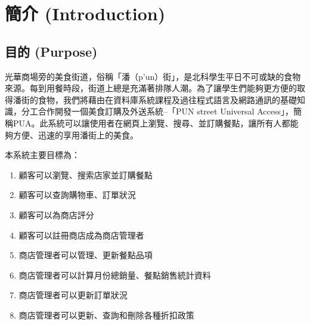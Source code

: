 \documentclass[a4paper, 12pt]{article}
\begin{document}





\section{簡介 (Introduction)}

\subsection{目的 (Purpose)}

光華商場旁的美食街道，俗稱「潘（p'un）街」，是北科學生平日不可或缺的食物來源。每到用餐時段，街道上總是充滿著排隊人潮。為了讓學生們能夠更方便的取得潘街的食物，我們將藉由在資料庫系統課程及過往程式語言及網路通訊的基礎知識，分工合作開發一個美食訂購及外送系統--「PUN street Universal Access」，簡稱PUA。此系統可以讓使用者在網頁上瀏覽、搜尋、並訂購餐點，讓所有人都能夠方便、迅速的享用潘街上的美食。

\noindent 本系統主要目標為：
\begin{enumerate}
  \item 顧客可以瀏覽、搜索店家並訂購餐點
  \item 顧客可以查詢購物車、訂單狀況
  \item 顧客可以為商店評分
  \item 顧客可以註冊商店成為商店管理者
  \item 商店管理者可以管理、更新餐點品項
  \item 商店管理者可以計算月份總銷量、餐點銷售統計資料
  \item 商店管理者可以更新訂單狀況
  \item 商店管理者可以更新、查詢和刪除各種折扣政策
\end{enumerate}
\end{document}
